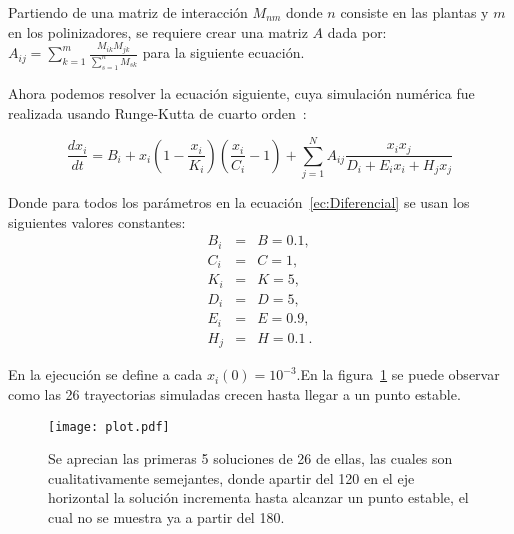 \documentclass[11pt]{article}
\begin{document}
Partiendo de una matriz de interacción $M_{nm}$ donde $n$ consiste en las plantas y $m$ en los polinizadores, se requiere crear una matriz $A$ dada por: $
A_{ij}=\sum^m_{k=1}\frac{M_{ik}M_{jk}}{\sum^n_{s=1}M_{sk}}
$ para la siguiente ecuación.

Ahora podemos resolver la ecuación siguiente, cuya simulación numérica fue realizada usando Runge-Kutta de cuarto orden~\cite{numerical2002recipes}:

\begin{equation}
\label{ec:Diferencial}
\frac{dx_i}{dt} = B_{i}+x_{i}\left( 1-\frac{x_{i}}{K_{i}}\right ) \left(\frac{x_{i}}{C_{i}}-1\right)+\sum^N_{j=1}A_{ij}\frac{x_{i}x_{j}}{D_{i}+E_{i}x_{i}+H_{j}x_{j}}
\end{equation}


Donde para todos los parámetros en la ecuación~\eqref{ec:Diferencial} se usan los siguientes valores constantes:
\begin{eqnarray*}
B_{i}&=&B=0.1,\\
C_{i}&=&C=1,\\
K_{i}&=&K=5,\\ 
D_{i}&=&D=5,\\
E_{i}&=&E=0.9,\\
H_{j}&=&H=0.1\ .
\end{eqnarray*}

En la ejecución se define a cada $x_{i}(0)=10^{-3}$.En la figura~\ref{fig-sol} se puede observar como las 26 trayectorias simuladas crecen hasta llegar a un punto estable.

\begin{figure}[hb]
\label{fig-sol}
\texttt{[image: plot.pdf]}
\caption{Se aprecian las primeras 5 soluciones de 26 de ellas, las cuales son cualitativamente semejantes, donde apartir del 120 en el eje horizontal la solución incrementa hasta alcanzar un punto estable, el cual no se muestra ya a partir del 180.}
\end{figure}

        

 
\end{document}
